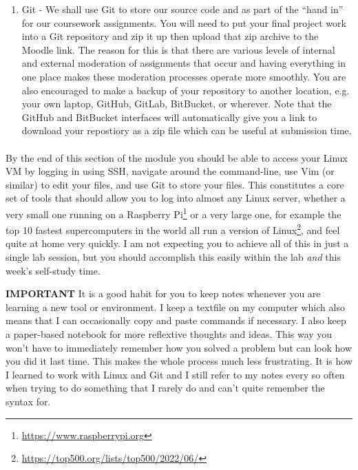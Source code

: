 \documentclass[12pt, a4paper, oneside]{book}
\begin{document}
\begin{enumerate}
\item Git - We shall use Git to store our source code and as part of the ``hand in'' for our coursework assignments. You will need to put your final project work into a Git repository and zip it up then upload that zip archive to the Moodle link. The reason for this is that there are various levels of internal and external moderation of assignments that occur and having everything in one place makes these moderation processes operate more smoothly. You are also encouraged to make a backup of your repository to another location, e.g. your own laptop, GitHub, GitLab, BitBucket, or wherever. Note that the GitHub and BitBucket interfaces will automatically give you a link to download your repostiory as a zip file which can be useful at submission time.
\end{enumerate}

\paragraph{} By the end of this section of the module you should be able to access your Linux VM by logging in using SSH, navigate around the command-line, use Vim (or similar) to edit your files, and use Git to store your files. This constitutes a core set of tools that should allow you to log into almost any Linux server, whether a very small one running on a Raspberry Pi\footnote{\url{https://www.raspberrypi.org}} or a very large one, for example the top 10 fastest supercomputers in the world all run a version of Linux\footnote{\url{https://top500.org/lists/top500/2022/06/}}, and feel quite at home very quickly. I am not expecting you to achieve all of this in just a single lab session, but you should accomplish this easily within the lab \emph{and} this week's self-study time.

\begin{framed}
\textbf{IMPORTANT} It is a good habit for you to keep notes whenever you are learning a new tool or environment. I keep a textfile on my computer which also means that I can occasionally copy and paste commands if necessary. I also keep a paper-based notebook for more reflextive thoughts and ideas. This way you won't have to immediately remember how you solved a problem but can look how you did it last time. This makes the whole process much less frustrating. It is how I learned to work with Linux and Git and I still refer to my notes every so often when trying to do something that I rarely do and can't quite remember the syntax for.
\end{framed}
\end{document}
